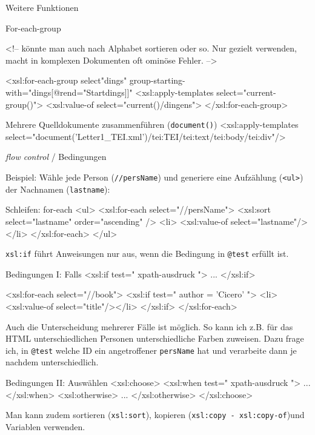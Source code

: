 \begin{frame}{Weitere Funktionen}
\begin{myxml}{For-each-group}

<!-- könnte man auch nach Alphabet sortieren oder so. Nur gezielt verwenden, macht in komplexen Dokumenten oft ominöse Fehler. -->

<xsl:for-each-group select"dings" group-starting-with="dings[@rend="Startdings]]"
    <xsl:apply-templates select="current-group()">
    <xsl:value-of select="current()/dingens">
</xsl:for-each-group>

\end{myxml}

\begin{myxml}{Mehrere Quelldokumente zusammenführen (\texttt{document()})}
<xsl:apply-templates select="document('Letter1_TEI.xml')/tei:TEI/tei:text/tei:body/tei:div"/>
\end{myxml}
\end{frame}

\begin{frame}{\emph{flow control} / Bedingungen}


Beispiel: Wähle jede Person (\texttt{//persName}) und generiere eine Aufzählung (\texttt{<ul>}) der Nachnamen (\texttt{lastname}):
\begin{myxml}{Schleifen: for-each}
<ul>
<xsl:for-each select="//persName">
    <xsl:sort select="lastname" order="ascending" />
    <li> <xsl:value-of select="lastname"/> </li>
</xsl:for-each>
</ul>
\end{myxml}


\texttt{xsl:if} führt Anweisungen nur aus, wenn die Bedingung in \texttt{@test} erfüllt ist.
\begin{myxml}{Bedingungen I: Falls}
<xsl:if test=" xpath-ausdruck "> ... </xsl:if>

<xsl:for-each select="//book">
    <xsl:if test=" author = 'Cicero' ">
        <li><xsl:value-of select="title"/></li>
    </xsl:if>
</xsl:for-each>
\end{myxml}

Auch die Unterscheidung mehrerer Fälle ist möglich. So kann ich z.B. für das HTML unterschiedlichen Personen unterschiedliche Farben zuweisen. Dazu frage ich, in \texttt{@test} welche ID ein angetroffener \texttt{persName} hat und verarbeite dann je nachdem unterschiedlich.
\begin{myxml}{Bedingungen II: Auswählen}
<xsl:choose>
    <xsl:when test=" xpath-ausdruck "> ... </xsl:when>
    <xsl:otherwise> ... </xsl:otherwise>
</xsl:choose>
\end{myxml}

Man kann zudem sortieren (\texttt{xsl:sort}), kopieren (\texttt{xsl:copy - xsl:copy-of})und Variablen verwenden. 

\end{frame}

